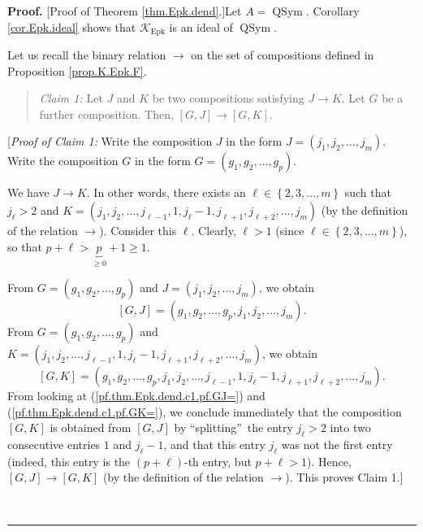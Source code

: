 \documentclass[numbers=enddot,12pt,final,onecolumn,notitlepage]{scrartcl}%
\theoremstyle{definition}
\newenvironment{statement}{\begin{quote}}{\end{quote}}
\newenvironment{proof}[1][Proof]{\noindent\textbf{#1.} }{\ \rule{0.5em}{0.5em}}
\begin{document}
\begin{proof}
[Proof of Theorem \ref{thm.Epk.dend}.]Let $A=\operatorname*{QSym}$. Corollary
\ref{cor.Epk.ideal} shows that $\mathcal{K}_{\operatorname*{Epk}}$ is an ideal
of $\operatorname*{QSym}$.

Let us recall the binary relation $\rightarrow$ on the set of compositions
defined in Proposition \ref{prop.K.Epk.F}.

\begin{statement}
\textit{Claim 1:} Let $J$ and $K$ be two compositions satisfying $J\rightarrow
K$. Let $G$ be a further composition. Then, $\left[  G,J\right]
\rightarrow\left[  G,K\right]  $.
\end{statement}

[\textit{Proof of Claim 1:} Write the composition $J$ in the form $J=\left(
j_{1},j_{2},\ldots,j_{m}\right)  $. Write the composition $G$ in the form
$G=\left(  g_{1},g_{2},\ldots,g_{p}\right)  $.

We have $J\rightarrow K$. In other words, there exists an $\ell\in\left\{
2,3,\ldots,m\right\}  $ such that $j_{\ell}>2$ and $K=\left(  j_{1}%
,j_{2},\ldots,j_{\ell-1},1,j_{\ell}-1,j_{\ell+1},j_{\ell+2},\ldots
,j_{m}\right)  $ (by the definition of the relation $\rightarrow$). Consider
this $\ell$. Clearly, $\ell>1$ (since $\ell\in\left\{  2,3,\ldots,m\right\}
$), so that $p+\ell>\underbrace{p}_{\geq0}+1\geq1$.

From $G=\left(  g_{1},g_{2},\ldots,g_{p}\right)  $ and $J=\left(  j_{1}%
,j_{2},\ldots,j_{m}\right)  $, we obtain%
\begin{equation}
\left[  G,J\right]  =\left(  g_{1},g_{2},\ldots,g_{p},j_{1},j_{2},\ldots
,j_{m}\right)  . \label{pf.thm.Epk.dend.c1.pf.GJ=}%
\end{equation}
From $G=\left(  g_{1},g_{2},\ldots,g_{p}\right)  $ and $K=\left(  j_{1}%
,j_{2},\ldots,j_{\ell-1},1,j_{\ell}-1,j_{\ell+1},j_{\ell+2},\ldots
,j_{m}\right)  $, we obtain%
\begin{equation}
\left[  G,K\right]  =\left(  g_{1},g_{2},\ldots,g_{p},j_{1},j_{2}%
,\ldots,j_{\ell-1},1,j_{\ell}-1,j_{\ell+1},j_{\ell+2},\ldots,j_{m}\right)  .
\label{pf.thm.Epk.dend.c1.pf.GK=}%
\end{equation}
From looking at (\ref{pf.thm.Epk.dend.c1.pf.GJ=}) and
(\ref{pf.thm.Epk.dend.c1.pf.GK=}), we conclude immediately that the
composition $\left[  G,K\right]  $ is obtained from $\left[  G,J\right]  $ by
\textquotedblleft splitting\textquotedblright\ the entry $j_{\ell}>2$ into two
consecutive entries $1$ and $j_{\ell}-1$, and that this entry $j_{\ell}$ was
not the first entry (indeed, this entry is the $\left(  p+\ell\right)  $-th
entry, but $p+\ell>1$). Hence, $\left[  G,J\right]  \rightarrow\left[
G,K\right]  $ (by the definition of the relation $\rightarrow$). This proves
Claim 1.]


\end{proof}
\end{document}
